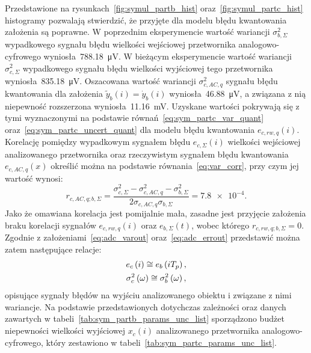 Przedstawione na rysunkach~\ref{fig:symul_partb_hist} oraz~\ref{fig:symul_partc_hist} histogramy pozwalają stwierdzić, że przyjęte dla modelu błędu kwantowania założenia są poprawne. W poprzednim eksperymencie wartość wariancji $\sigma_{b,\Sigma}^{2}$ wypadkowego sygnału błędu wielkości wejściowej przetwornika analogowo-cyfrowego wyniosła~\qty{788.18}{\micro V}. W bieżącym eksperymencie wartość wariancji $\sigma_{c,\Sigma}^{2}$ wypadkowego sygnału błędu wielkości wyjściowej tego przetwornika wyniosła~\qty{835.18}{\micro V}. Oszacowana wartość wariancji $\sigma_{c,AC,q}^{2}$ sygnału błędu kwantowania dla założenia $\tilde{y}_{b}(i) = \dot{y}_{b}(i)$ wyniosła~\qty{46.88}{\micro V}, a związana z nią niepewność rozszerzona wyniosła~\qty{11.16}{mV}. Uzyskane wartości pokrywają się z tymi wyznaczonymi na podstawie równań~\eqref{eq:sym_partc_var_quant} oraz~\eqref{eq:sym_partc_uncert_quant} dla modelu błędu kwantowania $e_{c,rw,q}(i)$. Korelację pomiędzy wypadkowym sygnałem błędu $e_{c,\Sigma}(i)$ wielkości wejściowej analizowanego przetwornika oraz rzeczywistym sygnałem błędu kwantowania $e_{c,AC,q}(x)$ określić można na podstawie równania~\eqref{eq:var_corr}, przy czym jej wartość wynosi:
\begin{equation}
r_{c,AC,q;b,\Sigma} = \frac{\sigma_{c,\Sigma}^{2} - \sigma_{c,AC,q}^{2} - \sigma_{b,\Sigma}^{2}}{2 \sigma_{c,AC,q} \sigma_{b,\Sigma}} = \num{7.8e-4} \label{eq:sym_partc_corr}.
\end{equation}
Jako że omawiana korelacja jest pomijalnie mała, zasadne jest przyjęcie założenia braku korelacji sygnałów $e_{c,rw,q}(i)$ oraz $e_{b,\Sigma}(t)$, wobec którego $r_{c,rw,q;b,\Sigma} = 0$. Zgodnie z założeniami~\eqref{eq:adc_varout} oraz~\eqref{eq:adc_errout} przedstawić można zatem następujące relacje:
\begin{gather}
e_{c} \left(i\right) \cong e_{b} \left(iT_{p}\right) \label{eq:sym_partc_err_prop}, \\
\sigma_{c}^{2} \left(\omega\right) \cong \sigma_{b}^{2} \left(\omega\right) \label{eq:sym_partc_var_prop},
\end{gather}
opisujące sygnały błędów na wyjściu analizowanego obiektu i związane z nimi wariancje. Na podstawie przedstawionych dotychczas zależności oraz danych zawartych w tabeli~\ref{tab:sym_partb_params_unc_list} sporządzono budżet niepewności wielkości wyjściowej $x_{c}(i)$ analizowanego przetwornika analogowo-cyfrowego, który zestawiono w tabeli~\ref{tab:sym_partc_params_unc_list}.

